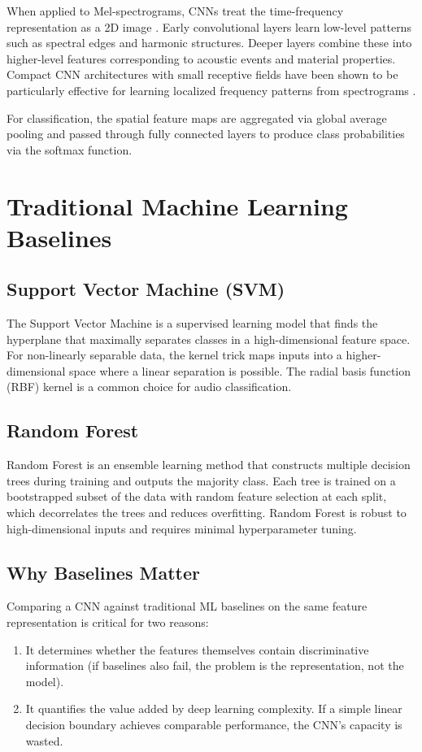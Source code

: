 \documentclass[12pt,a4paper,oneside]{report}
\begin{document}
When applied to Mel-spectrograms, CNNs treat the time-frequency representation as a 2D image \cite{dennis2014,sbcnn2016}. Early convolutional layers learn low-level patterns such as spectral edges and harmonic structures. Deeper layers combine these into higher-level features corresponding to acoustic events and material properties. Compact CNN architectures with small receptive fields have been shown to be particularly effective for learning localized frequency patterns from spectrograms \cite{sbcnn2016,zhang2019}.

For classification, the spatial feature maps are aggregated via global average pooling and passed through fully connected layers to produce class probabilities via the softmax function.

\section{Traditional Machine Learning Baselines}

\subsection{Support Vector Machine (SVM)}

The Support Vector Machine is a supervised learning model that finds the hyperplane that maximally separates classes in a high-dimensional feature space. For non-linearly separable data, the kernel trick maps inputs into a higher-dimensional space where a linear separation is possible. The radial basis function (RBF) kernel is a common choice for audio classification.

\subsection{Random Forest}

Random Forest is an ensemble learning method that constructs multiple decision trees during training and outputs the majority class. Each tree is trained on a bootstrapped subset of the data with random feature selection at each split, which decorrelates the trees and reduces overfitting. Random Forest is robust to high-dimensional inputs and requires minimal hyperparameter tuning.

\subsection{Why Baselines Matter}

Comparing a CNN against traditional ML baselines on the same feature representation is critical for two reasons:
\begin{enumerate}
    \item It determines whether the features themselves contain discriminative information (if baselines also fail, the problem is the representation, not the model).
    \item It quantifies the value added by deep learning complexity. If a simple linear decision boundary achieves comparable performance, the CNN's capacity is wasted.
\end{enumerate}
\end{document}
